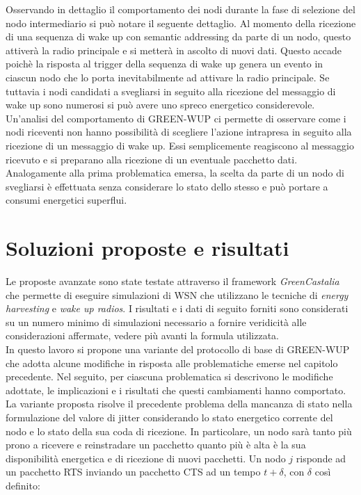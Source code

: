 \documentclass{report}
\begin{document}
Osservando in dettaglio il comportamento dei nodi durante la fase di selezione del nodo intermediario si può notare il seguente dettaglio.
Al momento della ricezione di una sequenza di wake up con semantic addressing da parte di un nodo, questo attiverà la radio principale e si metterà in
ascolto di nuovi dati. Questo accade poichè la risposta al trigger della sequenza di wake up genera un evento in ciascun nodo che lo porta inevitabilmente
ad attivare la radio principale. Se tuttavia i nodi candidati a svegliarsi in seguito alla ricezione del messaggio di wake up sono numerosi si può avere uno
spreco energetico considerevole. Un'analisi del comportamento di GREEN-WUP ci permette di osservare come i nodi riceventi non hanno possibilità di scegliere l'azione
intrapresa in seguito alla ricezione di un messaggio di wake up. Essi semplicemente reagiscono al messaggio ricevuto e si preparano alla ricezione di un
eventuale pacchetto dati. Analogamente alla prima problematica emersa, la scelta da parte di un nodo di svegliarsi è effettuata senza considerare lo stato dello
stesso e può portare a consumi energetici superflui.

\section{Soluzioni proposte e risultati}

Le proposte avanzate sono state testate attraverso il framework \emph{GreenCastalia} che permette di eseguire simulazioni di WSN che utilizzano le tecniche
di \emph{energy harvesting} e \emph{wake up radios}. I risultati e i dati di seguito forniti sono considerati su un numero minimo di simulazioni
necessario a fornire veridicità alle considerazioni affermate, vedere più avanti la formula utilizzata.\\

In questo lavoro si propone una variante del protocollo di base di GREEN-WUP che adotta alcune modifiche in risposta alle problematiche emerse nel capitolo
precedente. Nel seguito, per ciascuna problematica si descrivono le modifiche adottate, le implicazioni e i risultati che questi cambiamenti hanno comportato.\\

La variante proposta risolve il precedente problema della mancanza di stato nella formulazione del valore di jitter considerando lo stato energetico
corrente del nodo e lo stato della sua coda di ricezione. In particolare, un nodo sarà tanto più prono a ricevere e reinstradare un pacchetto quanto
più è alta è la sua disponibilità energetica e di ricezione di nuovi pacchetti. Un nodo $j$ risponde ad un pacchetto RTS inviando un pacchetto CTS
ad un tempo $t+\delta$, con $\delta$ così definito:
\end{document}
